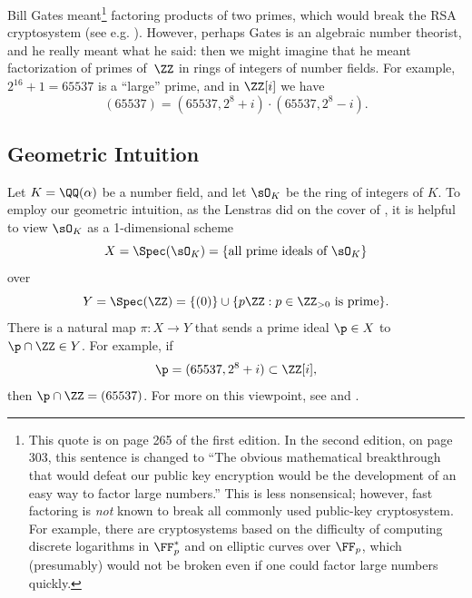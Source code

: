 %

Bill Gates meant\footnote{This quote is on page 265 of the first
  edition.  In the second edition, on page 303, this sentence is
  changed to ``The obvious mathematical breakthrough that would defeat
  our public key encryption would be the development of an easy way to
  factor large numbers.''  This is less nonsensical; however, fast
  factoring is {\em not} known to break all commonly used public-key
  cryptosystem.  For example, there are cryptosystems based on the
  difficulty of computing discrete logarithms in $\FF_p^*$ and on
  elliptic curves over $\FF_p$, which (presumably) would not be broken
  even if one could factor large numbers quickly.}  factoring products
of two primes, which would break the RSA cryptosystem (see
e.g. \cite[\S3.2]{stein:ent}).  However, perhaps Gates is an
algebraic number theorist, and he really meant what he said: then we
might imagine that he meant factorization of primes of~$\ZZ$ in rings
of integers of number fields.  For example, $2^{16}+1 = 65537$ is a
``large'' prime, and in $\ZZ[i]$ we have
$$
  (65537) = (65537, 2^8 + i) \cdot (65537, 2^8 - i).
$$

\subsection{Geometric Intuition}\label{sec:geom_intuition}

Let $K=\QQ(\alpha)$ be a number field, and let $\sO_K$ be the ring of integers
of $K$. To employ our geometric intuition, as the Lenstras did on the cover
of \cite{lenstras:nfs}, it is helpful to view $\sO_K$ as a 1-dimensional scheme
$$
  X = \Spec(\sO_K) = \{\text{all prime ideals of $\sO_K$}\}
$$
over
$$
  Y=\Spec(\ZZ) = \{ (0) \} \cup \{ p\ZZ : p \in\ZZ_{>0} \text{ is prime}\}.
$$
There is a natural map $\pi: X \rightarrow Y$ that sends a prime ideal $\p\in X$ to
$\p \cap \ZZ\in Y$. For example, if
$$
  \p = (65537, 2^8 + i) \subset \ZZ[i],
$$
then $\p \cap \ZZ = (65537)$. For more on this viewpoint,
see \cite{hartshorne} and \cite[Ch.~2]{eisenbud_harris:geometry}.

